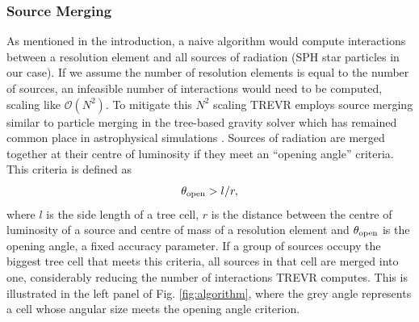 \documentclass[fleq,usenatbib]{mnras}
\newcommand{\acro}{TREVR}
\newcommand{\bigO}[1]{\mathcal{O}\left(#1\right)}
\newcommand{\tO}{\theta_{\rm open}}
\begin{document}
\subsubsection{Source Merging}
As mentioned in the introduction, a naive algorithm would compute interactions 
between a resolution element and  all sources of radiation (SPH star particles 
in our case). If we assume the number of resolution elements is equal to the 
number of sources, an infeasible number of interactions would need to be 
computed, scaling like $\bigO{N^2}$. To mitigate this $N^2$ scaling \acro{} 
employs source merging similar to particle merging in the \cite{barnesHut86} 
tree-based gravity solver which has remained common place in astrophysical 
simulations \citep{benz88,vineSigurdsson98,springelEt01,wadsleyEt03,
hubberEt11}. Sources of radiation are merged together at their centre of 
luminosity if they meet an ``opening angle'' criteria. This criteria is 
defined as 
\begin{equation}
\label{eqn:openangle}
\tO > l/r,
\end{equation}
where $l$ is the side length of a tree cell, $r$ is the distance between the 
centre of luminosity of a source and centre of mass of a resolution element 
and $\tO$ is the opening angle, a fixed accuracy parameter. If a 
group of sources occupy the biggest tree cell that meets this criteria, all 
sources in that cell are merged into one, considerably reducing the number of 
interactions \acro{} computes. This is illustrated in the left panel of Fig. 
\ref{fig:algorithm}, where the grey angle represents a cell whose angular size 
meets the opening angle criterion.
\end{document}
